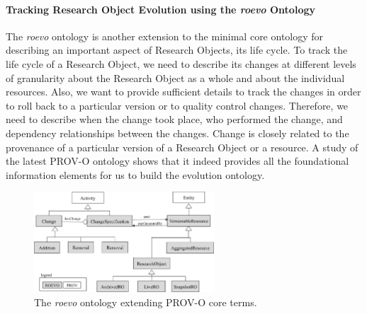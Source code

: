 \paragraph{Tracking Research Object Evolution using the \textit{roevo} Ontology}
The \textit{roevo} ontology is another extension to the minimal core ontology for describing an important aspect of Research Objects, its life cycle.
To track the life cycle of a Research Object, we need to describe its changes at different levels of granularity about the Research Object as a whole and about the individual resources. Also, we want to provide sufficient details to track the changes in order to roll back to a particular version or to quality control changes. Therefore, we need to describe when the change took place, who performed the change, and dependency relationships between the changes. %
Change is closely related to the provenance of a particular version of a Research Object or a resource. A study of the latest PROV-O ontology shows that it indeed provides all the foundational information elements for us to build the evolution ontology. 

\begin{figure}[ht]
  \centering
  \includegraphics[width=0.6\textwidth]{Figures/roevo.png}
  \caption{The \textit{roevo} ontology extending PROV-O core terms.}
  \label{fig:ro_evo}
\end{figure}    

